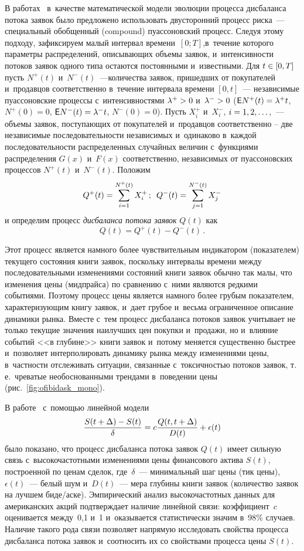 \begin{multicols}{2}
В работах~\cite{Korolev_2013, Chertok2014} в~качестве
математической модели эволюции процесса дисбаланса потока \mbox{заявок}
было предложено использовать двусторонний процесс риска~---
специальный обобщенный (compound) пуассоновский процесс. Следуя
этому подходу, зафиксируем малый интервал времени~$[0; T]$,\linebreak в~течение
которого параметры распределений, описывающих объемы заявок,
и~интенсивности потоков заявок одного типа остаются постоянными и~известными.
Для $t\hm\in[0,T]$ пусть $N^+(t)$ и~$N^-(t)$~---\linebreak количества
заявок, пришедших от покупателей и~продавцов соответственно
в~течение интервала времени $[0,t]$~--- независимые пуассоновские
процессы с~интенсивностями $\lambda^+ \hm> 0$ и~$\lambda^- \hm> 0$ (${\sf E}
N^+(t) = \lambda^+ t$, $N^+(0) = 0$, ${\sf E} N^-(t) = \lambda^- t$,
$N^-(0) = 0$). Пусть $X^+_i$ и~$X^-_i$, $i\hm=1,2,\ldots, $~--- объемы
заявок, поступающих от покупателей и~продавцов соответственно -- две
независимые последовательности независимых и~одинаково в~каждой
последовательности распределенных случайных величин с~функциями
распределения $G(x)$ и~$F(x)$ соответственно, независимых от
пуассоновских процессов $N^+(t)$ и~$N^-(t)$. Положим
$$
Q^+(t)=\sum\limits_{i=1}^{N^+(t)}X_i^+\,;\enskip
Q^-(t)=\sum\limits_{j=1}^{N^-(t)}X_j^-
$$
и определим процесс {\it дисбаланса потока заявок} $Q(t)$ как
$$
Q(t)=Q^+(t) - Q^-(t)\,.
$$

Этот процесс является намного более чувствительным индикатором
(показателем) текущего состо\-яния книги заявок, поскольку интервалы
времени между последовательными изменениями со\-сто\-яний книги заявок
обычно так малы, что изменения цены (мидпрайса) по сравнению с~ними
являются редкими событиями. Поэтому процесс цены является намного
более грубым показателем, характеризующим книгу заявок, и~дает грубое
и~весьма ограниченное описание динамики рынка. Вместе с~тем процесс
дисбаланса потоков заявок учитывает не только текущие значения
наилучших цен покупки и~продажи, но и~влияние событий <<в глубине>>
книги заявок и~потому меняется существенно быстрее и~позволяет
интерполировать динамику рынка между изменениями цены, в~част\-ности
отслеживать ситуации, связанные с~токсичностью потоков заявок, т.\,е.\
чреватые необоснованными трендами в~поведении цены (рис.~\ref{fig:ofibidask_mono}).


В работе~\cite{Cont2014} с~помощью линейной модели
$$
\displaystyle\frac{\displaystyle S(t + \Delta) - S(t)\mathstrut}{\displaystyle \delta\mathstrut} = c \displaystyle\frac{\displaystyle Q(t, t + \Delta)\mathstrut}{\displaystyle D(t)\mathstrut} + \epsilon(t)
$$
было показано, что процесс дисбаланса потока заявок $Q(t)$ имеет
сильную связь с~высокочастотными изменениями цены финансового актива
$S(t)$, построенной по ценам сделок, где~$\delta$~--- минимальный шаг
цены (тик цены), $\epsilon(t)$~--- белый шум и~$D(t)$~--- мера глубины
книги заявок (количество заявок на лучшем биде/аске). Эмпирический
анализ высокочастотных данных для американских акций подтверждает
наличие линейной связи: коэффициент~$c$ оценивается между~0,1 и~1
и~оказывается статистически значим в~98\% случаев. Наличие
такого рода связи позволяет напрямую исследовать свойства процесса
дисбаланса потока заявок и~соотносить их со свойствами процесса цены
$S(t)$.


\end{multicols}
